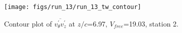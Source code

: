 \begin{figure}[H]
\centering
\texttt{[image: figs/run\_13/run\_13\_tw\_contour]}
\caption{Contour plot of $\overline{v_{\theta}^{\prime} v_{z}^{\prime}}$ at $z/c$=6.97, $V_{free}$=19.03, station 2.}
\label{fig:run_13_tw_contour}
\end{figure}


